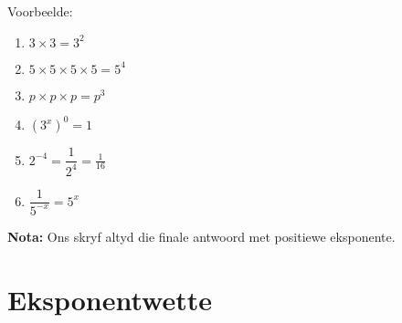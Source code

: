 Voorbeelde:
\begin{enumerate}[noitemsep, label=\textbf{\arabic*.}]
\item $3 \times 3 = 3^2$
\item $5 \times 5 \times 5 \times 5 = 5^4 $
\item $p \times p \times p = p^3$
\item $(3^x)^0 = 1$
\item $ 2^{-4} = \dfrac{1}{2^4} = \frac{1}{16}$
\item $ \dfrac{1}{5^{-x}} = 5^x$
\end{enumerate}

% 
% 
% 
% 
% 
% 
% 
      
\textbf{Nota:} Ons skryf altyd die finale antwoord met positiewe eksponente.


% 
% 
% 
% 

\par
{}  
    


\section {Eksponentwette}
\nopagebreak

